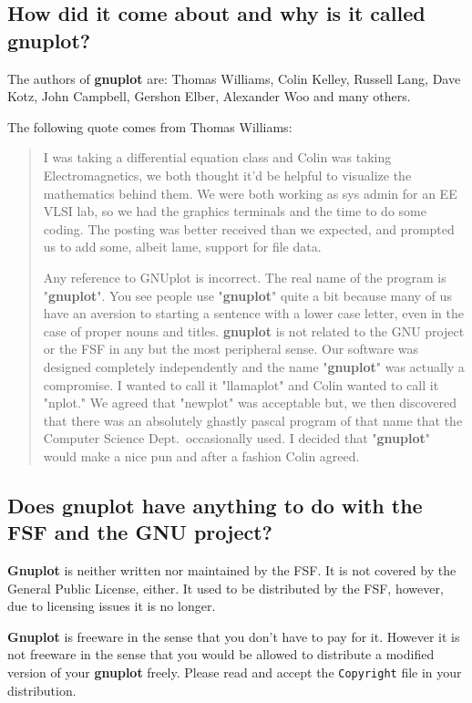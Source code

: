\documentclass[a4paper,11pt]{article}
\newcommand{\gnuplot}{\textbf{gnuplot}}
\newcommand{\Gnuplot}{\textbf{Gnuplot}}
\begin{document}
\subsection{How did it come about and why is it called \gnuplot?}

The authors of \gnuplot{} are:
Thomas Williams, Colin Kelley, Russell Lang, Dave Kotz, John
Campbell, Gershon Elber, Alexander Woo and many others.

The following quote comes from Thomas Williams:
\begin{quote}
     I was taking a differential equation class and Colin was taking
     Electromagnetics, we both thought it'd be helpful to visualize the
     mathematics behind them. We were both working as sys admin for an
     EE VLSI lab, so we had the graphics terminals and the time to do
     some coding. The posting was better received than we expected, and
     prompted us to add some, albeit lame, support for file data.

     Any reference to GNUplot is incorrect. The real name of the program
     is "\gnuplot". You see people use "\gnuplot" quite a bit because many
     of us have an aversion to starting a sentence with a lower case
     letter, even in the case of proper nouns and titles. \gnuplot{} is not
     related to the GNU project or the FSF in any but the most
     peripheral sense. Our software was designed completely
     independently and the name "\gnuplot" was actually a compromise. I
     wanted to call it "llamaplot" and Colin wanted to call it "nplot."
     We agreed that "newplot" was acceptable but, we then discovered
     that there was an absolutely ghastly pascal program of that name
     that the Computer Science Dept.\ occasionally used. I decided that
     "\gnuplot" would make a nice pun and after a fashion Colin agreed.
\end{quote}


\subsection{Does \gnuplot{} have anything to do with the FSF and the GNU
project?}

\Gnuplot{} is neither written nor maintained by the FSF\@. It is not
covered by the General Public License, either. It used to be distributed
by the FSF, however, due to licensing issues it is no longer.

\Gnuplot{} is freeware in the sense that you don't have to pay
for it. However it is not freeware in the sense that you would be
allowed to distribute a modified version of your \gnuplot{} freely.
Please read and accept the \texttt{Copyright} file in your distribution.
\end{document}
